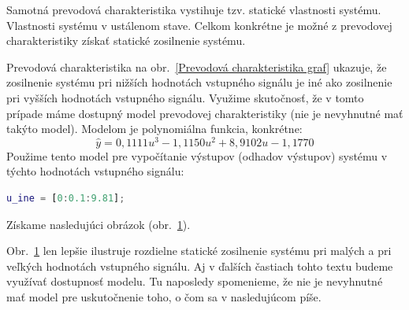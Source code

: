 \documentclass[a4paper, 10pt, ]{article}
\begin{document}
Samotná prevodová charakteristika vystihuje tzv. statické vlastnosti systému. Vlastnosti systému v ustálenom stave. Celkom konkrétne je možné z prevodovej charakteristiky získať statické zosilnenie systému.

Prevodová charakteristika na obr.~\ref{Prevodová charakteristika graf} ukazuje, že zosilnenie systému pri nižších hodnotách vstupného signálu je iné ako zosilnenie pri vyšších hodnotách vstupného signálu. Využime skutočnosť, že v tomto prípade máme dostupný model prevodovej charakteristiky (nie je nevyhnutné mať takýto model). Modelom je polynomiálna funkcia, konkrétne:
\begin{equation} \label{modelPolifitVysl}
    \hat y = 0,1111 u^3  -1,1150 u^2 + 8,9102 u  -1,1770
\end{equation}
Použime tento model pre vypočítanie výstupov (odhadov výstupov) systému v týchto hodnotách vstupného signálu:
\begin{lstlisting}[language=Matlab,]
u_ine = [0:0.1:9.81];
\end{lstlisting}
Získame nasledujúci obrázok (obr.~\ref{Prevodová charakteristika graf2}).

\begin{figure}[!t]
	\centering


    \vspace{-4mm}

	\caption{}
	\label{Prevodová charakteristika graf2}

\end{figure}

Obr.~\ref{Prevodová charakteristika graf2} len lepšie ilustruje rozdielne statické zosilnenie systému pri malých a pri veľkých hodnotách vstupného signálu. Aj v ďalších častiach tohto textu budeme využívať dostupnosť modelu. Tu naposledy spomenieme, že nie je nevyhnutné mať model pre uskutočnenie toho, o čom sa v nasledujúcom píše.
\end{document}

